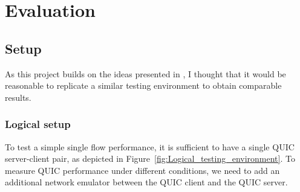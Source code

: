 \documentclass[12pt,a4paper,twoside,openright]{report}
\begin{document}






\chapter{Evaluation}





\section{Setup}

As this project builds on the ideas presented in \cite{Making_QUIC_Quicker}, I thought that it would be reasonable to replicate a similar testing environment to obtain comparable results.

\subsection{Logical setup}
To test a simple single flow performance, it is sufficient to have a single QUIC server-client pair, as depicted in Figure~\ref{fig:Logical_testing_environment}.
To measure QUIC performance under different conditions, we need to add an additional network emulator between the QUIC client and the QUIC server.
\end{document}
